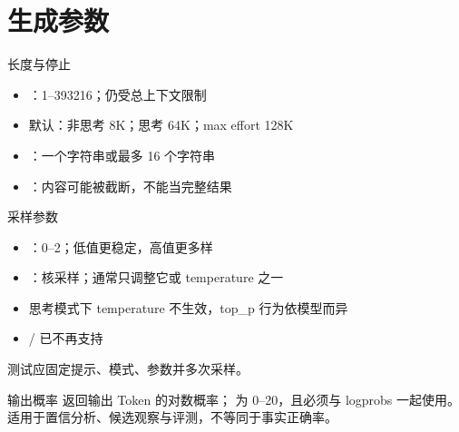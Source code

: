 \documentclass[aspectratio=169,UTF8]{ctexbeamer}
\begin{document}
\section{生成参数}
\begin{frame}{长度与停止}
\begin{itemize}
  \item {}：1--393216；仍受总上下文限制
  \item 默认：非思考 8K；思考 64K；max effort 128K
  \item {}：一个字符串或最多 16 个字符串
  \item {}：内容可能被截断，不能当完整结果
\end{itemize}
\end{frame}
\begin{frame}{采样参数}
\begin{itemize}
  \item {}：0--2；低值更稳定，高值更多样
  \item {}：核采样；通常只调整它或 temperature 之一
  \item 思考模式下 temperature 不生效，top\_p 行为依模型而异
  \item {} /  已不再支持
\end{itemize}
测试应固定提示、模式、参数并多次采样。
\end{frame}
\begin{frame}{输出概率}
 返回输出 Token 的对数概率； 为 0--20，且必须与 logprobs 一起使用。\\[8pt]
适用于置信分析、候选观察与评测，不等同于事实正确率。
\end{frame}
\end{document}
